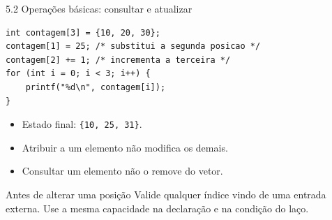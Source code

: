 \begin{frame}[fragile]{5.2 Operações básicas: consultar e atualizar}
\begin{lstlisting}
int contagem[3] = {10, 20, 30};
contagem[1] = 25; /* substitui a segunda posicao */
contagem[2] += 1; /* incrementa a terceira */
for (int i = 0; i < 3; i++) {
    printf("%d\n", contagem[i]);
}
\end{lstlisting}
\begin{itemize}
\item Estado final: \texttt{\{10, 25, 31\}}.
\item Atribuir a um elemento não modifica os demais.
\item Consultar um elemento não o remove do vetor.
\end{itemize}
\begin{block}{Antes de alterar uma posição}
Valide qualquer índice vindo de uma entrada externa. Use a mesma capacidade na declaração e na condição do laço.
\end{block}
\end{frame}

